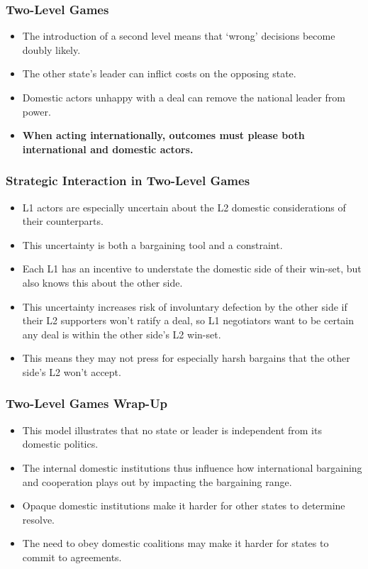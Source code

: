 \documentclass{beamer}
\begin{document}
\begin{frame} 
	\frametitle{\LARGE{Two-Level Games}}
		\begin{itemize}
			\item The introduction of a second level means that `wrong' decisions become doubly likely. \pause
			\item The other state's leader can inflict costs on the opposing state. \pause
			\item Domestic actors unhappy with a deal can remove the national leader from power. \pause
			\item \textbf{When acting internationally, outcomes must please both international and domestic actors.}
		\end{itemize}
\end{frame}

\begin{frame} 
	\frametitle{\LARGE{Strategic Interaction in Two-Level Games}}
	\begin{itemize}
		\item L1 actors are especially uncertain about the L2 domestic considerations of their counterparts. \pause
		\item This uncertainty is both a bargaining tool and a constraint. \pause
		\item Each L1 has an incentive to understate the domestic side of their win-set, but also knows this about the other side. \pause
		\item This uncertainty increases risk of involuntary defection by the other side if their L2 supporters won't ratify a deal, so L1 negotiators want to be certain any deal is within the other side's L2 win-set. \pause
		\item This means they may not press for especially harsh bargains that the other side's L2 won't accept.
	\end{itemize}
\end{frame}

\begin{frame} 
	\frametitle{\LARGE{Two-Level Games Wrap-Up}}
	\begin{itemize}
		\item This model illustrates that no state or leader is independent from its domestic politics.
		\item The internal domestic institutions thus influence how international bargaining and cooperation plays out by impacting the bargaining range. \pause
		\item Opaque domestic institutions make it harder for other states to determine resolve.  \pause 
		\item The need to obey domestic coalitions may make it harder for states to commit to agreements.
	\end{itemize}
\end{frame}
\end{document}
